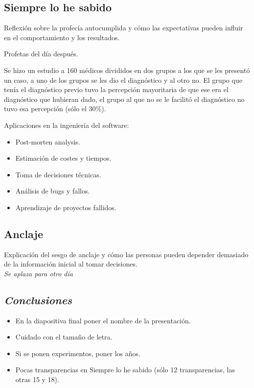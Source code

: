 \documentclass[12pt, a4paper, twoside]{article}
\begin{document}
\subsection{Siempre lo he sabido}

Reflexión sobre la profecía autocumplida y cómo las expectativas pueden influir en el comportamiento y los resultados.


Profetas del día después.

Se hizo un estudio a 160 médicos divididos en dos grupos a los que se les presentó un caso, a uno de los grupos se les dio el diagnóstico
y al otro no. El grupo que tenía el diagnóstico previo tuvo la percepción mayoritaria de que ese era el diagnóstico que hubieran dado, el grupo 
al que no se le facilitó el diagnóstico no tuvo esa percepción (sólo el 30\%).
\newline

Aplicaciones en la ingeniería del software:
\begin{itemize}
    \item Post-morten analysis.
    \item Estimación de costes y tiempos.
    \item Toma de decisiones técnicas.
    \item Análisis de bugs y fallos.
    \item Aprendizaje de proyectos fallidos.
\end{itemize}


\subsection{Anclaje}
Explicación del sesgo de anclaje y cómo las personas pueden depender demasiado de la información inicial al tomar decisiones.\\
\textit{Se aplaza para otro día}


\subsection{\textit{Conclusiones}}
\begin{itemize}
    \item En la diapositiva final poner el nombre de la presentación.
    \item Cuidado con el tamaño de letra.
    \item Si se ponen experimentos, poner los años.
    \item Pocas transparencias en Siempre lo he sabido (sólo 12 transparencias, las otras 15 y 18).

\end{itemize}
\end{document}
